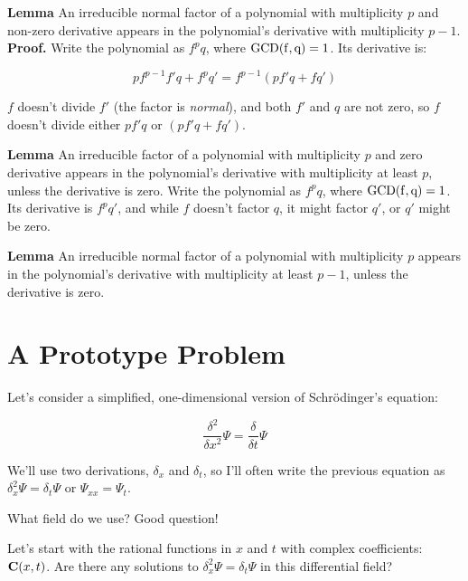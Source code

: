 \documentclass{article}
\newcommand{\GCD}{\ensuremath{\rm{GCD}}}
\begin{document}
{\bf Lemma} An irreducible normal factor of a polynomial with multiplicity
$p$ and non-zero derivative appears in the polynomial's derivative
with multiplicity $p-1$.  {\bf Proof.}  Write the polynomial as $f^p q$, where
$\GCD(f,q)=1$.  Its derivative is:

$$p f^{p-1} f' q + f^p q' = f^{p-1}(pf'q + fq')$$

$f$ doesn't divide $f'$ (the factor is {\it normal}), and both $f'$
and $q$ are not zero, so $f$ doesn't divide either $pf'q$ or
$(pf'q+fq')$.

{\bf Lemma} An irreducible factor of a polynomial with multiplicity
$p$ and zero derivative appears in the polynomial's derivative with
multiplicity at least $p$, unless the derivative is zero.  Write the
polynomial as $f^p q$, where $\GCD(f,q)=1$.  Its derivative is $f^p
q'$, and while $f$ doesn't factor $q$, it might factor $q'$, or
$q'$ might be zero.

{\bf Lemma} An irreducible normal factor of a polynomial with multiplicity
$p$ appears in the polynomial's derivative with multiplicity at least
$p-1$, unless the derivative is zero.

\vfill\eject
\section*{A Prototype Problem}

Let's consider a simplified, one-dimensional version of Schr\"odinger's equation:

$$\frac{\delta^2}{\delta x^2} \Psi = \frac{\delta}{\delta t} \Psi$$

We'll use two derivations, $\delta_x$ and $\delta_t$, so I'll often
write the previous equation as $\delta_x^2 \Psi = \delta_t \Psi$
or $\Psi_{xx} = \Psi_{t}$.

What field do we use?  Good question!

Let's start with the rational functions in $x$ and $t$ with
complex coefficients: ${\bf C}(x,t)$.  Are there any solutions
to $\delta_x^2\Psi = \delta_t\Psi$ in this differential field?
\end{document}
